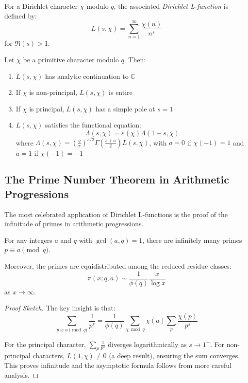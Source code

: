 \begin{definition}
For a Dirichlet character $\chi$ modulo $q$, the associated \emph{Dirichlet L-function} is defined by:
\begin{equation}
L(s,\chi) = \sum_{n=1}^{\infty} \frac{\chi(n)}{n^s}
\end{equation}
for $\Re(s) > 1$.
\end{definition}

\begin{theorem}
Let $\chi$ be a primitive character modulo $q$. Then:
\begin{enumerate}
\item $L(s,\chi)$ has analytic continuation to $\mathbb{C}$
\item If $\chi$ is non-principal, $L(s,\chi)$ is entire
\item If $\chi$ is principal, $L(s,\chi)$ has a simple pole at $s=1$
\item $L(s,\chi)$ satisfies the functional equation:
\begin{equation}
\Lambda(s,\chi) = \varepsilon(\chi) \Lambda(1-s,\bar{\chi})
\end{equation}
where $\Lambda(s,\chi) = \left(\frac{q}{\pi}\right)^{s/2} \Gamma\left(\frac{s+a}{2}\right) L(s,\chi)$, with $a = 0$ if $\chi(-1) = 1$ and $a = 1$ if $\chi(-1) = -1$
\end{enumerate}
\end{theorem}

\subsection{The Prime Number Theorem in Arithmetic Progressions}

The most celebrated application of Dirichlet L-functions is the proof of the infinitude of primes in arithmetic progressions.

\begin{theorem}
For any integers $a$ and $q$ with $\gcd(a,q) = 1$, there are infinitely many primes $p \equiv a \pmod{q}$.

Moreover, the primes are equidistributed among the reduced residue classes:
\begin{equation}
\pi(x; q, a) \sim \frac{1}{\phi(q)} \frac{x}{\log x}
\end{equation}
as $x \to \infty$.
\end{theorem}

\begin{proof}[Proof Sketch]
The key insight is that:
\begin{equation}
\sum_{p \equiv a \pmod{q}} \frac{1}{p^s} = \frac{1}{\phi(q)} \sum_{\chi \bmod q} \bar{\chi}(a) \sum_p \frac{\chi(p)}{p^s}
\end{equation}

For the principal character, $\sum_p \frac{1}{p^s}$ diverges logarithmically as $s \to 1^+$. For non-principal characters, $L(1,\chi) \neq 0$ (a deep result), ensuring the sum converges. This proves infinitude and the asymptotic formula follows from more careful analysis.
\end{proof}


